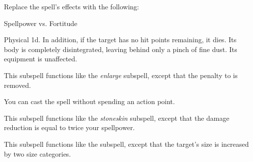 Replace the spell's effects with the following:
\begin{spellcontent}

\begin{augmenteffects}




\begin{spellattack}{Spellpower vs. Fortitude}


\spellsuccess
Physical  \plus1d.
In addition, if the target has no hit points remaining, it dies.
Its body is completely disintegrated, leaving behind only a pinch of fine dust.
Its equipment is unaffected.



\end{spellattack}





\end{augmenteffects}

\end{spellcontent}






This subspell functions like the \textit{enlarge} subspell, except that the penalty to  is removed.






You can cast the spell without spending an action point.






This subspell functions like the \textit{stoneskin} subspell, except that the damage reduction is equal to twice your spellpower.







This subspell functions like the  subspell, except that the target's size is increased by two size categories.





